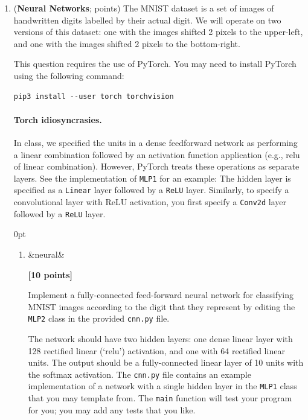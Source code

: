 \documentclass{article}
\newcounter{totalpoints}
\newcommand{\question}[2][]{(\textbf{#2}; \subtotal{#1})}
\newcommand{\subtotal}[1]{\newcounter{#1}\setcounter{#1}{0}\regtotcounter{#1}\total{#1} points}
\newcommand{\points}[2][]{{\addtocounter{totalpoints}{#2}\ifx&#1&\else\addtocounter{#1}{#2}\fi\textbf{[#2 points]}}}
\begin{document}
\clearpage




\begin{enumerate}





\item \question[neural]{Neural Networks}
\label{q:code}
The MNIST dataset is a set of images of handwritten digits labelled by their actual digit.
We will operate on two versions of this dataset: one with the images shifted 2 pixels to the upper-left, and one with the images shifted 2 pixels to the bottom-right.

This question requires the use of PyTorch.  You may need to install PyTorch using the following command:
\begin{verbatim}
pip3 install --user torch torchvision
\end{verbatim}

\paragraph{Torch idiosyncrasies.}
In class, we specified the units in a dense feedforward network as performing a linear combination followed by an activation function application (e.g., relu of linear combination).  However, PyTorch treats these operations as separate layers.  See the implementation of \verb|MLP1| for an example: The hidden layer is specified as a \verb|Linear| layer followed by a \verb|ReLU| layer.  Similarly, to specify a convolutional layer with ReLU activation, you first specify a \verb|Conv2d| layer followed by a \verb|ReLU| layer.

\begin{answer}{0pt}
\end{answer}

\begin{enumerate}
\item\points[neural]{10}
Implement a fully-connected feed-forward neural network for classifying MNIST images according to the digit that they represent by editing the \verb|MLP2| class in the provided \texttt{cnn.py} file.

The network should have two hidden layers: one dense linear layer with 128 rectified linear (`relu') activation, and one with  64 rectified linear units.
The output should be a fully-connected linear layer of 10 units with the softmax activation.  The \texttt{cnn.py} file contains an example implementation of a network with a single hidden layer in the \verb|MLP1| class that you may template from.  The \verb|main| function will test your program for you; you may add any tests that you like.


\end{enumerate}
\end{enumerate}
\end{document}

